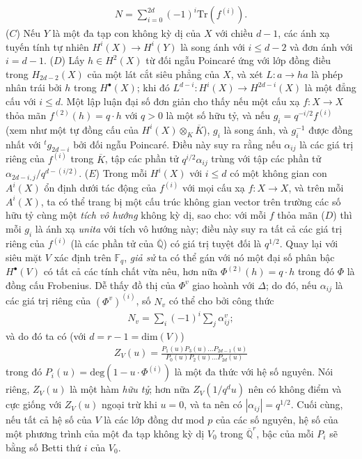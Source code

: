 \begin{multicols}{2}
		\begin{align*} \label{eq:13}
			N  = \sum_{i=0}^{2d} (-1)^i \mathrm{Tr}(f^{(i)}). \tag{$13$}
		\end{align*}
	($C$) Nếu $Y$ là một đa tạp con không kỳ dị của $X$ với chiều $d-1$, các ánh xạ tuyến tính tự nhiên $H^i(X) \to H^i(Y)$ là song ánh với $i \leq d-2$ và đơn ánh với $i = d-1$. 
	\vskip 0.1cm
	($D$) Lấy $h \in H^2(X)$ từ đối ngẫu Poincaré ứng với lớp đồng điều trong $H_{2d-2}(X)$ của một lát cắt siêu phẳng của $X$, và xét $L: a \to ha$ là phép nhân trái bởi $h$ trong $H^{\bullet}(X)$; khi đó $L^{d-i}: H^i(X) \to H^{2d-i}(X)$ là một đẳng cấu với $i \leq d$.
	\vskip 0.1cm
	Một lập luận đại số đơn giản cho thấy nếu một cấu xạ $f: X \to X$ thỏa mãn $f^{(2)}(h) = q \cdot h$ với $q > 0$ là một số hữu tỷ, và nếu $g_i = q^{-i/2}f^{(i)}$ (xem như một tự đồng cấu của $H^{i}(X) \otimes_K \overline{K}$), $g_i$ là song ánh, và $g_i^{-1}$ được đồng nhất với $\text{}^tg_{2d-i}$ bởi đối ngẫu Poincaré. Điều này suy ra rằng nếu $\alpha_{ij}$ là các giá trị riêng của $f^{(i)}$ trong $\overline{K}$, tập các phần tử $q^{i/2}\alpha_{ij}$ trùng với tập các phần tử $\alpha_{2d-i,j}/q^{d-(i/2)}$.
	\vskip 0.1cm
	($E$) Trong mỗi $H^i(X)$ với $i \leq d$ có một không gian con $A^i(X)$ ổn định dưới tác động của $f^{(i)}$ với mọi cấu xạ $f: X \to X$, và trên mỗi $A^i(X)$, ta có thể trang bị một cấu trúc không gian vector trên trường các số hữu tỷ cùng một \textit{tích vô hướng} không kỳ dị, sao cho: với mỗi $f$ thỏa mãn ($D$) thì mỗi $g_i$ là ánh xạ \textit{unita} với tích vô hướng này; điều này suy ra tất cả các giá trị riêng của $f^{(i)}$ (là các phần tử của $\overline{\mathbb{Q}}$) có giá trị tuyệt đối là $q^{1/2}$.
	\vskip 0.1cm
	Quay lại với siêu mặt $V$ xác định trên $\mathbb{F}_q$, \textit{giả sử} ta có thể gán với nó một đại số phân bậc $H^{\bullet}(V)$ có tất cả các tính chất vừa nêu, hơn nữa $\Phi^{(2)}(h) = q \cdot h$ trong đó $\Phi$ là đồng cấu Frobenius. Dễ thấy đồ thị của $\Phi^v$ giao hoành với $\Delta$; do đó, nếu $\alpha_{ij}$ là các giá trị riêng của $(\Phi^v)^{(i)}$, số $N_v$ có thể cho bởi công thức
	\begin{align*} 
		N_v = \sum_i (-1)^i \sum_j \alpha_{ij}^v;\tag{$14$}
	\end{align*}
	và do đó ta có (với $d= r-1=\mathrm{dim}(V)$)
	\begin{align*} \label{eq:15}
		Z_V(u) = \frac{P_1(u)P_3(u)...P_{2d-1}(u)}{P_0(u)P_2(u)...P_{2d}(u)} \tag{$15$}
	\end{align*}
	trong đó $P_i(u) = \mathrm{deg}(1 - u \cdot \Phi^{(i)})$ là một đa thức với hệ số nguyên. Nói riêng, $Z_V(u)$ là một hàm \textit{hữu tỷ}; hơn nữa $Z_V(1/q^d u)$ nên có không điểm và cực giống với $Z_V(u)$ ngoại trừ khi $u=0$, và ta nên có $\left|\alpha_{ij}\right|=q^{1/2}$. Cuối cùng, nếu tất cả hệ số của $V$ là các lớp đồng dư mod $p$ của các số nguyên, hệ số của một phương trình của một đa tạp không kỳ dị $V_0$ trong $\overline{\mathbb{Q}}^r$, bậc của mỗi $P_i$ sẽ bằng số Betti thứ $i$ của $V_0$. 

\end{multicols}
